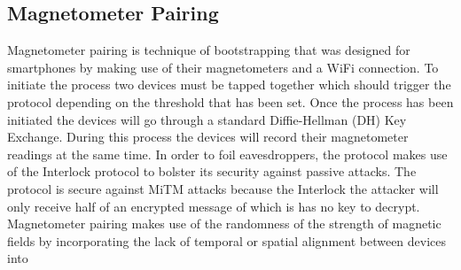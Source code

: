 \subsection{Magnetometer Pairing}
Magnetometer pairing is technique of bootstrapping that was designed for smartphones by making use of their magnetometers and a WiFi connection. To initiate the process two devices must be tapped together which should trigger the protocol depending on the threshold that has been set. Once the process has been initiated the devices will go through a standard Diffie-Hellman (DH) Key Exchange. During this process the devices will record their magnetometer readings at the same time. In order to foil eavesdroppers, the protocol makes use of the Interlock protocol to bolster its security against passive attacks. The protocol is secure against MiTM attacks because the Interlock the attacker will only receive half of an encrypted message of which is has no key to decrypt. Magnetometer pairing makes use of the randomness of the strength of magnetic fields by incorporating the lack of temporal or spatial alignment between devices into
